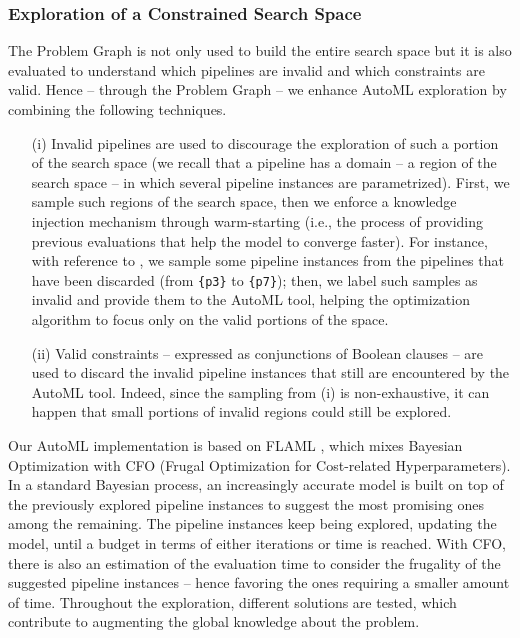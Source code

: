 \subsubsection{Exploration of a Constrained Search Space}\label{subsec:constrained_automl}

The Problem Graph is not only used to build the entire search space but it is also evaluated to understand which pipelines are invalid and which constraints are valid.
Hence -- through the Problem Graph -- we enhance AutoML exploration by combining the following techniques.
\begin{itemize}
    \item[(i)] Invalid pipelines are used to discourage the exploration of such a portion of the search space (we recall that a pipeline has a domain -- a region of the search space -- in which several pipeline instances are parametrized).
    First, we sample such regions of the search space, then we enforce a knowledge injection mechanism through warm-starting (i.e., the process of providing previous evaluations that help the model to converge faster).
    For instance, with reference to , we sample some pipeline instances from the pipelines that have been discarded (from \texttt{\{p3\}} to \texttt{\{p7\}});
    then, we label such samples as invalid and provide them to the AutoML tool, helping the optimization algorithm to focus only on the valid portions of the space.
    \item[(ii)] Valid constraints -- expressed as conjunctions of Boolean clauses -- are used to discard the invalid pipeline instances that still are encountered by the AutoML tool.
    Indeed, since the sampling from (i) is non-exhaustive, it can happen that small portions of invalid regions could still be explored.
\end{itemize}

Our AutoML implementation is based on FLAML \cite{wang2021flaml}, which mixes Bayesian Optimization with CFO (Frugal Optimization for Cost-related Hyperparameters).
In a standard Bayesian process, an increasingly accurate model is built on top of the previously explored pipeline instances to suggest the most promising ones among the remaining.
The pipeline instances keep being explored, updating the model, until a budget in terms of either iterations or time is reached.
With CFO, there is also an estimation of the evaluation time to consider the frugality of the suggested pipeline instances -- hence favoring the ones requiring a smaller amount of time.
Throughout the exploration, different solutions are tested, which contribute to augmenting the global knowledge about the problem.

